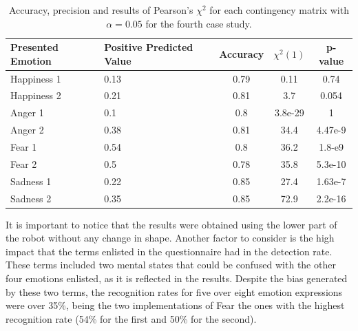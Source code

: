 \clearpage
\begin{table}[h]
\centering
\small
\caption{Accuracy, precision and results of Pearson's $\chi^2$ for each contingency matrix with $\alpha = 0.05$ for the fourth case study.} 
\label{table:Precision2}
		\begin{tabular}{|p{3 cm}|p{2 cm}|c|c|c|}
		\hline
		\textbf{Presented Emotion} & \textbf{Positive Predicted Value} & \textbf{Accuracy} & \textbf{$\chi^2(1)$} & \textbf{p-value}\\
		\hline
		Happiness 1 & 0.13 & 0.79 & 0.11 & 0.74\\
		\hline
		Happiness 2 & 0.21 & 0.81& 3.7 &0.054\\
		\hline
		Anger 1 & 0.1 & 0.8 & 3.8e-29 & 1\\
		\hline
		Anger 2 & 0.38 & 0.81 & 34.4 & 4.47e-9\\
		\hline
		Fear 1 & 0.54 & 0.8 & 36.2 & 1.8-e9\\
		\hline 
		Fear 2 & 0.5 & 0.78 & 35.8 & 5.3e-10\\
		\hline
		Sadness 1 & 0.22 & 0.85 & 27.4 & 1.63e-7\\
		\hline
		Sadness 2 & 0.35 & 0.85 & 72.9 & 2.2e-16\\		 
		\hline
			\end{tabular}
\end{table}
 
It is important to notice that the results were obtained using the lower part of the robot without any change in shape. Another factor to consider is the high impact that the terms enlisted in the questionnaire had in the detection rate. These terms included two mental states that could be confused with the other four emotions enlisted, as it is reflected in the results. Despite the bias generated by these two terms, the recognition rates for five over eight emotion expressions were over 35\%, being the two implementations of Fear the ones with the highest recognition rate (54\% for the first and 50\% for the second).
